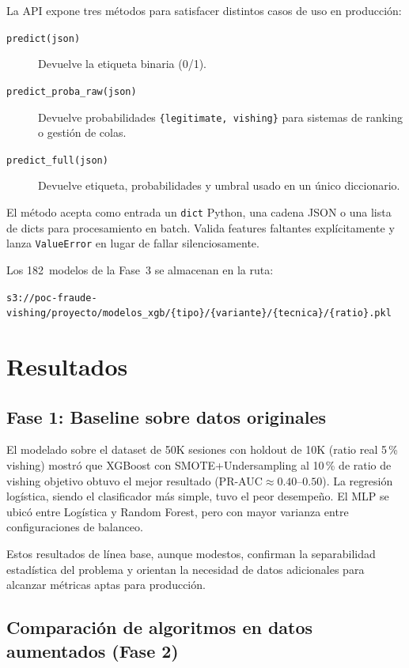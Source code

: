 \documentclass[journal]{IEEEtran}
\newcommand{\prauc}{\textsc{PR-AUC}}
\begin{document}
La API expone tres métodos para satisfacer distintos casos de uso en
producción:

\begin{description}
    \item[\texttt{predict(json)}] Devuelve la etiqueta binaria (0/1).
    \item[\texttt{predict\_proba\_raw(json)}] Devuelve probabilidades
    \texttt{\{legitimate, vishing\}} para sistemas de ranking o gestión de colas.
    \item[\texttt{predict\_full(json)}] Devuelve etiqueta, probabilidades y
    umbral usado en un único diccionario.
\end{description}

El método acepta como entrada un \texttt{dict} Python, una cadena JSON o una
lista de dicts para procesamiento en batch. Valida features faltantes
explícitamente y lanza \texttt{ValueError} en lugar de fallar silenciosamente.

Los 182~modelos de la Fase~3 se almacenan en la ruta:
\begin{center}
\small
\texttt{s3://poc-fraude-vishing/proyecto/modelos\_xgb/\{tipo\}/\{variante\}/\{tecnica\}/\{ratio\}.pkl}
\end{center}

\section{Resultados}
\label{sec:resultados}

\subsection{Fase 1: Baseline sobre datos originales}

El modelado sobre el dataset de 50K sesiones con holdout de 10K (ratio real
5\,\% vishing) mostró que XGBoost con SMOTE+Undersampling al 10\,\% de ratio
de vishing objetivo obtuvo el mejor resultado (\prauc{}$\approx 0.40$--$0.50$).
La regresión logística, siendo el clasificador más simple, tuvo el peor
desempeño. El MLP se ubicó entre Logística y Random Forest, pero con mayor
varianza entre configuraciones de balanceo.

Estos resultados de línea base, aunque modestos, confirman la separabilidad
estadística del problema y orientan la necesidad de datos adicionales para
alcanzar métricas aptas para producción.

\subsection{Comparación de algoritmos en datos aumentados (Fase 2)}
\end{document}
